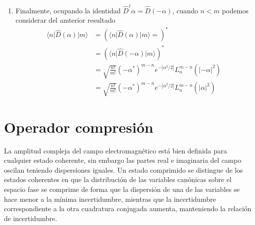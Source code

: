 \begin{enumerate}
  \item Finalmente, ocupando la identidad $\hat{D}^\dagger{\alpha} = \hat{D}(-\alpha)$, cuando $n<m$ podemos considerar del amterior resultado
        \begin{align*}
          \langle n \vert \hat{D}(\alpha)\vert m\rangle & = \left( \langle n \vert \hat{D}(\alpha) \vert m\rangle = \right)^{*}            \\
                                                        & = \left( \langle n \vert \hat{D}(-\alpha) \vert m\rangle \right)^{*}             \\
                                                        & = \sqrt{\frac{n!}{m!}}(-\alpha^*)^{m-n} e^{-|\alpha^2/2|}L_n^{m-n} (|-\alpha|^2) \\
                                                        & = \sqrt{\frac{n!}{m!}}(-\alpha^*)^{m-n} e^{-|\alpha^2/2|}L_n^{m-n} (|\alpha|^2)
        \end{align*}
\end{enumerate}

\section{Operador compresión}


La amplitud compleja del campo electromagnético está bien definida para cualquier estado coherente, sin embargo las partes real e imaginaria del campo oscilan teniendo dispersiones iguales. Un estado comprimido se distingue de los estados coherentes en que la distribución de las variables canónicas sobre el espacio fase se comprime de forma que la dispersión de una de las variables se hace menor a la mínima incertidumbre, mientras que la incertidumbre correspondiente a la otra cuadratura conjugada aumenta, manteniendo la relación de incertidumbre.

